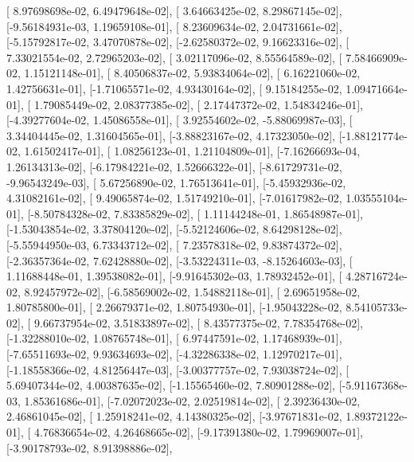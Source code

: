 \documentclass{article}
\begin{document}
       [ 8.97698698e-02,  6.49479648e-02],
       [ 3.64663425e-02,  8.29867145e-02],
       [-9.56184931e-03,  1.19659108e-01],
       [ 8.23609634e-02,  2.04731661e-02],
       [-5.15792817e-02,  3.47070878e-02],
       [-2.62580372e-02,  9.16623316e-02],
       [ 7.33021554e-02,  2.72965203e-02],
       [ 3.02117096e-02,  8.55564589e-02],
       [ 7.58466909e-02,  1.15121148e-01],
       [ 8.40506837e-02,  5.93834064e-02],
       [ 6.16221060e-02,  1.42756631e-01],
       [-1.71065571e-02,  4.93430164e-02],
       [ 9.15184255e-02,  1.09471664e-01],
       [ 1.79085449e-02,  2.08377385e-02],
       [ 2.17447372e-02,  1.54834246e-01],
       [-4.39277604e-02,  1.45086558e-01],
       [ 3.92554602e-02, -5.88069987e-03],
       [ 3.34404445e-02,  1.31604565e-01],
       [-3.88823167e-02,  4.17323050e-02],
       [-1.88121774e-02,  1.61502417e-01],
       [ 1.08256123e-01,  1.21104809e-01],
       [-7.16266693e-04,  1.26134313e-02],
       [-6.17984221e-02,  1.52666322e-01],
       [-8.61729731e-02, -9.96543249e-03],
       [ 5.67256890e-02,  1.76513641e-01],
       [-5.45932936e-02,  4.31082161e-02],
       [ 9.49065874e-02,  1.51749210e-01],
       [-7.01617982e-02,  1.03555104e-01],
       [-8.50784328e-02,  7.83385829e-02],
       [ 1.11144248e-01,  1.86548987e-01],
       [-1.53043854e-02,  3.37804120e-02],
       [-5.52124606e-02,  8.64298128e-02],
       [-5.55944950e-03,  6.73343712e-02],
       [ 7.23578318e-02,  9.83874372e-02],
       [-2.36357364e-02,  7.62428880e-02],
       [-3.53224311e-03, -8.15264603e-03],
       [ 1.11688448e-01,  1.39538082e-01],
       [-9.91645302e-03,  1.78932452e-01],
       [ 4.28716724e-02,  8.92457972e-02],
       [-6.58569002e-02,  1.54882118e-01],
       [ 2.69651958e-02,  1.80785800e-01],
       [ 2.26679371e-02,  1.80754930e-01],
       [-1.95043228e-02,  8.54105733e-02],
       [ 9.66737954e-02,  3.51833897e-02],
       [ 8.43577375e-02,  7.78354768e-02],
       [-1.32288010e-02,  1.08765748e-01],
       [ 6.97447591e-02,  1.17468939e-01],
       [-7.65511693e-02,  9.93634693e-02],
       [-4.32286338e-02,  1.12970217e-01],
       [-1.18558366e-02,  4.81256447e-03],
       [-3.00377757e-02,  7.93038724e-02],
       [ 5.69407344e-02,  4.00387635e-02],
       [-1.15565460e-02,  7.80901288e-02],
       [-5.91167368e-03,  1.85361686e-01],
       [-7.02072023e-02,  2.02519814e-02],
       [ 2.39236430e-02,  2.46861045e-02],
       [ 1.25918241e-02,  4.14380325e-02],
       [-3.97671831e-02,  1.89372122e-01],
       [ 4.76836654e-02,  4.26468665e-02],
       [-9.17391380e-02,  1.79969007e-01],
       [-3.90178793e-02,  8.91398886e-02],
\end{document}
